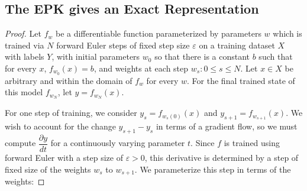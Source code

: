 \subsection{The EPK gives an Exact Representation}
\label{proof:eker}
\eker*
\begin{proof}

Let $f_{w}$ be a differentiable function parameterized by parameters $w$ which is trained via $N$ forward Euler steps of fixed step size $\varepsilon$ on a training dataset $X$ with labels $ Y$, with initial parameters $w_0$ so that there is a constant $b$ such that for every $x$, $f_{w_0}(x) = b$, and weights at each step ${w_s : 0 \leq s \leq N}$. Let $x \in X$ be arbitrary and within the domain of $f_w$ for every $w$. For the final trained state of this model $f_{w_N}$, let $y = f_{w_N}(x)$. 

For one step of training, we consider $y_s  = f_{w_s(0)}(x)$ and $y_{s+1} = f_{w_{s+1}}(x)$. We wish to account for the change $y_{s+1} - y_s$ in terms of a gradient flow, so we must compute $\dfrac{\partial y}{dt}$ for a continuously varying parameter $t$. Since $f$ is trained using forward Euler with a step size of $\varepsilon > 0$, this derivative is determined by a step of fixed size of the weights $w_s$ to $w_{s+1}$. We parameterize this step in terms of the weights:


\end{proof}
